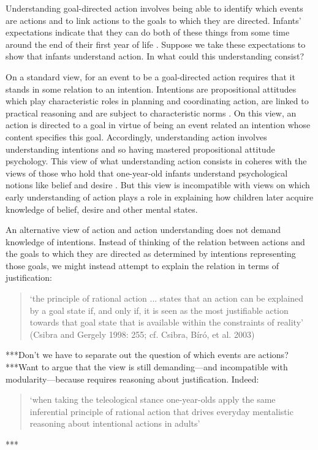 \documentclass[12pt,\papersize]{extarticle}
\begin{document}
Understanding goal-directed action involves being able to identify which events are actions and to link actions to the goals to which they are directed.
Infants' expectations indicate that they can do both of these things from some time around the end of their first year of life \citep{Csibra:2003kp}. 
Suppose we take these expectations to show that infants understand action.
In what could this understanding consist?

On a standard view, for an event to be a goal-directed action requires that it stands in some relation to an intention. 
Intentions are propositional attitudes which play characteristic roles in planning and coordinating action, are linked to practical reasoning and are subject to characteristic norms \citep{Bratman:1987xw}.
On this view, an action is directed to a goal in virtue of being an event related  an intention whose content specifies this goal. 
Accordingly, understanding action involves understanding intentions and so having mastered propositional attitude psychology.
This view of what understanding action consists in coheres with the views of those who hold that one-year-old infants understand psychological notions like belief and desire \citep{Baillargeon:gx}.
But this view is incompatible with  views on which early understanding of action plays a role in explaining how children later acquire knowledge of belief, desire and other mental states.

An alternative view of action and action understanding does not demand knowledge of intentions.
Instead of thinking of the relation between actions and the goals to which they are directed as determined by intentions representing those goals,
we might instead attempt to explain the relation in terms of justification:
%
\begin{quote}
`the principle of rational action ... states that an action can be explained by a goal state if, and only if, it is seen as the most justifiable action towards that goal state that is available within the constraints of reality' 
(Csibra and Gergely 1998: 255; cf. Csibra, Bíró, et al. 2003)
\end{quote}
%
***Don't we have to separate out the question of which events are actions?
***Want to argue that the view is still demanding---and incompatible with modularity---because requires reasoning about justification.  
Indeed:
%
\begin{quote}
`when taking the teleological stance one-year-olds apply the same inferential principle of rational action that drives everyday mentalistic reasoning about intentional actions in adults' \citep[p.\ 259]{Csibra:1998cx}\citep[compare][p.\ 290]{Gergely:2003gb}
\end{quote}
%
***
\end{document}
